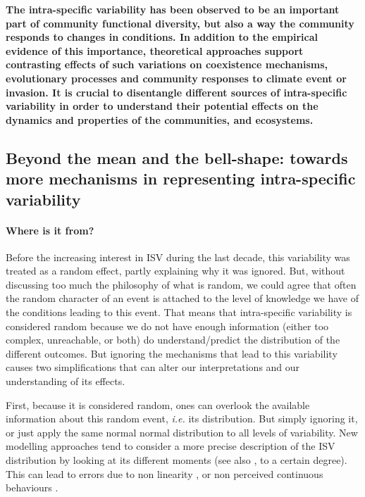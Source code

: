 %

\textbf{The intra-specific variability has been observed to be an important part of community functional diversity, but also a way the community responds to changes in conditions. In addition to the empirical evidence of this importance, theoretical approaches support contrasting effects of such variations on coexistence mechanisms, evolutionary processes and community responses to climate event or invasion. It is crucial to disentangle different sources of intra-specific variability in order to understand their potential effects on the dynamics and properties of the communities, and ecosystems.}

\subsection{Beyond the mean and the bell-shape: towards more mechanisms in representing intra-specific variability}\label{subsection:bell-shape}

\paragraph{Where is it from?}
Before the increasing interest in ISV during the last decade, this variability was treated as a random effect, partly explaining why it was ignored. But, without discussing too much the philosophy of what is random, we could agree that often the random character of an event is attached to the level of knowledge we have of the conditions leading to this event. That means that intra-specific variability is considered random because we do not have enough information (either too complex, unreachable, or both) do understand/predict the distribution of the different outcomes. But ignoring the mechanisms that lead to this variability causes two simplifications that can alter our interpretations and our understanding of its effects.

First, because it is considered random, ones can overlook the available information about this random event, \textit{i.e.} its distribution. But simply ignoring it, or just apply the same normal normal distribution to all levels of variability. New modelling approaches tend to consider a more precise description of the ISV distribution by looking at its different moments \parencite{dewitt_expanding_2016}(see also \citet{barabas_effect_2016}, to a certain degree). This can lead to errors due to non linearity \parencite{bolnick_why_2011, hart_how_2016}, or non perceived continuous behaviours \parencite{courbaud_intra-specific_2010}.

